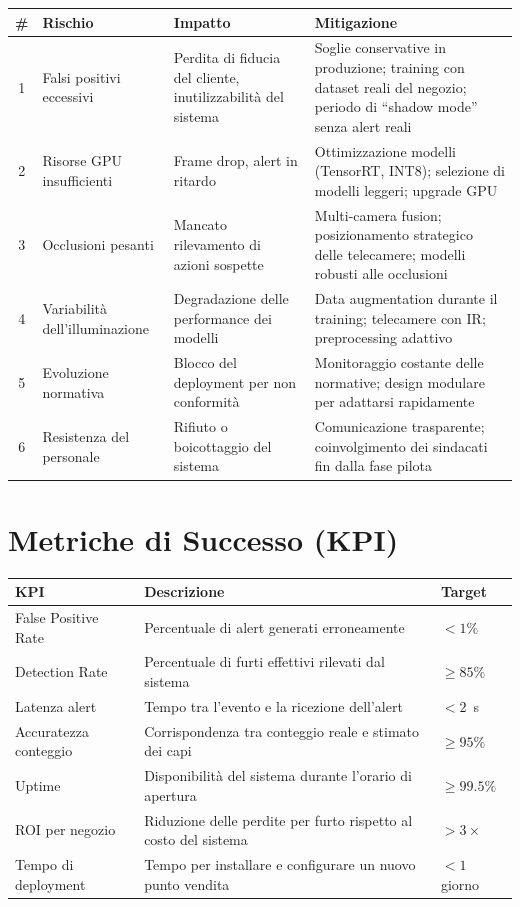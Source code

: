 \documentclass[a4paper, 12pt]{article}
\begin{document}
\begin{tabularx}{\textwidth}{clLL}
    \toprule
    \textbf{\#} & \textbf{Rischio} & \textbf{Impatto} & \textbf{Mitigazione} \\
     & Falsi positivi eccessivi & Perdita di fiducia del cliente, inutilizzabilità del sistema & Soglie conservative in produzione; training con dataset reali del negozio; periodo di ``shadow mode'' senza alert reali \\
    2 & Risorse GPU insufficienti & Frame drop, alert in ritardo & Ottimizzazione modelli (TensorRT, INT8); selezione di modelli leggeri; upgrade GPU \\
    3 & Occlusioni pesanti & Mancato rilevamento di azioni sospette & Multi-camera fusion; posizionamento strategico delle telecamere; modelli robusti alle occlusioni \\
    4 & Variabilità dell'illuminazione & Degradazione delle performance dei modelli & Data augmentation durante il training; telecamere con IR; preprocessing adattivo \\
    5 & Evoluzione normativa & Blocco del deployment per non conformità & Monitoraggio costante delle normative; design modulare per adattarsi rapidamente \\
    6 & Resistenza del personale & Rifiuto o boicottaggio del sistema & Comunicazione trasparente; coinvolgimento dei sindacati fin dalla fase pilota \\
    \bottomrule
\end{tabularx}

\section{Metriche di Successo (KPI)}

\begin{tabularx}{\textwidth}{lLl}
    \toprule
    \textbf{KPI} & \textbf{Descrizione} & \textbf{Target} \\
    \midrule
    False Positive Rate & Percentuale di alert generati erroneamente & $< 1\%$ \\
    Detection Rate & Percentuale di furti effettivi rilevati dal sistema & $\geq 85\%$ \\
    Latenza alert & Tempo tra l'evento e la ricezione dell'alert & $< 2$~s \\
    Accuratezza conteggio & Corrispondenza tra conteggio reale e stimato dei capi & $\geq 95\%$ \\
    Uptime & Disponibilità del sistema durante l'orario di apertura & $\geq 99.5\%$ \\
    ROI per negozio & Riduzione delle perdite per furto rispetto al costo del sistema & $> 3\times$ \\
    Tempo di deployment & Tempo per installare e configurare un nuovo punto vendita & $< 1$ giorno \\
    \bottomrule
\end{tabularx}
\end{document}
